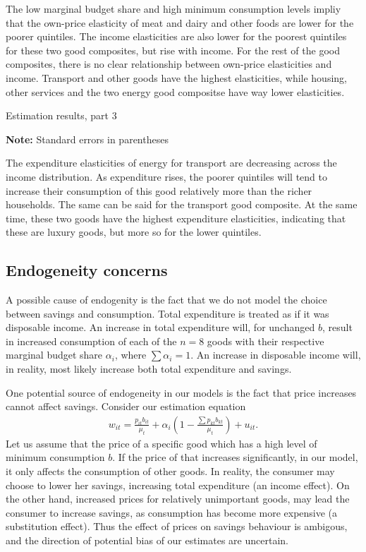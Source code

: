 The low marginal budget share and high minimum consumption levels impliy that the own-price elasticity of meat and dairy and other foods are lower for the poorer quintiles. The income elasticities are also lower for the poorest quintiles for these two good composites, but rise with income. For the rest of the good composites, there is no clear relationship between own-price elasticities and income. Transport and other goods have the highest elasticities, while housing, other services and the two energy good compositse have way lower elasticities. 
\begin{table}[H]
\centering
\renewcommand{\arraystretch}{0.7}
\caption{Estimation results, part 3}
\label{mdl7estpart3}

\captionsetup{singlelinecheck=off,size=scriptsize}
\setlength{\captionmargin}{10pt}
\caption*{
\textbf{Note:} Standard errors in parentheses}
\end{table}
The expenditure elasticities of energy for transport are decreasing across the income distribution. As expenditure rises, the poorer quintiles will tend to increase their consumption of this good relatively more than the richer households. The same can be said for the transport good composite. At the same time, these two goods have the highest expenditure elasticities, indicating that these are luxury goods, but more so for the lower quintiles.


\subsection{Endogeneity concerns}
A possible cause of endogenity is the fact that we do not model the choice between savings and consumption. Total expenditure is treated as if it was disposable income. An increase in total expenditure will, for unchanged $b$, result in increased consumption of each of the $n=8$ goods with their respective marginal budget share $\alpha_i$, where $\sum \alpha_i=1$. An increase in disposable income will, in reality, most likely increase both total expenditure and savings. 

One potential source of endogeneity in our models is the fact that price increases cannot affect savings. Consider our estimation equation
\begin{align}
    w_{it} = \frac{p_{it} b_{it}}{\mu_t} + \alpha_i \left( 1-\frac{\sum p_{kt}b_{kt}}{\mu_t}\right)+ u_{it}.
\end{align}
Let us assume that the price of a specific good which has a high level of minimum consumption $b$. If the price of that increases significantly, in our model, it only affects the consumption of other goods. In reality, the consumer may choose to lower her savings, increasing total expenditure (an income effect). On the other hand, increased prices for relatively unimportant goods, may lead the consumer to increase savings, as consumption has become more expensive (a substitution effect). Thus the effect of prices on savings behaviour is ambigous, and the direction of potential bias of our estimates are uncertain.

